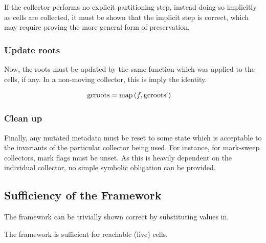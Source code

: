 If the collector performs no explicit partitioning step, instead doing
so implicitly as cells are collected, it must be shown that the
implicit step is correct, which may require proving the more general
form of preservation.

\subsubsection{Update roots}
\label{sec:gc-framework-obligations-roots}

Now, the roots must be updated by the same function which was applied
to the cells, if any. In a non-moving collector, this is imply the
identity.

\begin{align*}
  \mathrm{gcroots} &= \mathrm{map}\left(f, \mathrm{gcroots'}\right)
\end{align*}

\subsubsection{Clean up}
\label{sec:gc-framework-obligations-clean}

Finally, any mutated metadata must be reset to some state which is
acceptable to the invariants of the particular collector being
used. For instance, for mark-sweep collectors, mark flags must be
unset. As this is heavily dependent on the individual collector, no
simple symbolic obligation can be provided.

\subsection{Sufficiency of the Framework}
\label{sec:gc-framework-sufficiency}

The framework can be trivially shown correct by substituting values
in.

\begin{lemma}
  The framework is sufficient for reachable (live) cells.
\end{lemma}

